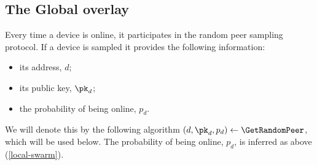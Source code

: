\subsection{The Global overlay}




Every time a device is online, it participates in the random peer sampling 
protocol.
If a device is sampled it provides the following information:
\begin{itemize}
  \item its address, \(d\);
  \item its public key, \(\pk_d\);
  \item the probability of being online, \(p_d\).
\end{itemize}
We will denote this by the following algorithm \((d, \pk_d, p_d)\gets 
  \GetRandomPeer\), which will be used below.
The probability of being online, \(p_d\), is inferred as above 
(\cref{local-swarm}).

